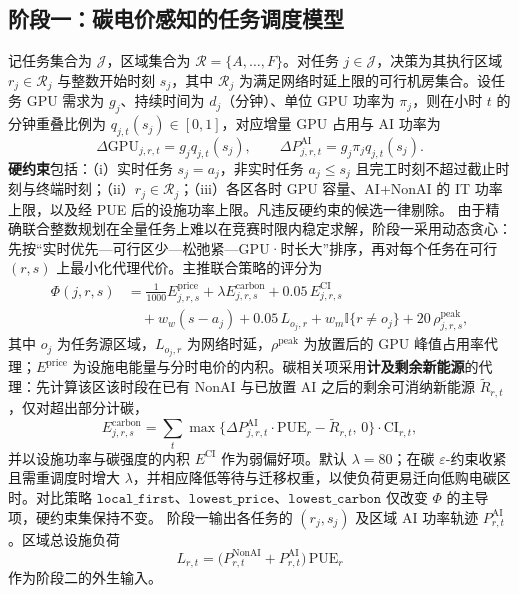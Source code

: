 \documentclass[UTF8,a4paper,zihao=-4]{ctexart}
\begin{document}
\subsection{阶段一：碳电价感知的任务调度模型}
记任务集合为 $\mathcal{J}$，区域集合为 $\mathcal{R}=\{A,\ldots,F\}$。对任务 $j\in\mathcal{J}$，决策为其执行区域 $r_j\in\mathcal{R}_j$ 与整数开始时刻 $s_j$，其中 $\mathcal{R}_j$ 为满足网络时延上限的可行机房集合。设任务 GPU 需求为 $g_j$、持续时间为 $d_j$（分钟）、单位 GPU 功率为 $\pi_j$，则在小时 $t$ 的分钟重叠比例为 $q_{j,t}(s_j)\in[0,1]$，对应增量 GPU 占用与 AI 功率为
\begin{equation}
\Delta\mathrm{GPU}_{j,r,t}
=
g_j q_{j,t}(s_j),\qquad
\Delta P^{\mathrm{AI}}_{j,r,t}
=
g_j\pi_j q_{j,t}(s_j).
\end{equation}
\textbf{硬约束}包括：（i）实时任务 $s_j=a_j$，非实时任务 $a_j\le s_j$ 且完工时刻不超过截止时刻与终端时刻；（ii）$r_j\in\mathcal{R}_j$；（iii）各区各时 GPU 容量、AI+NonAI 的 IT 功率上限，以及经 PUE 后的设施功率上限。凡违反硬约束的候选一律剔除。
由于精确联合整数规划在全量任务上难以在竞赛时限内稳定求解，阶段一采用动态贪心：先按“实时优先—可行区少—松弛紧—GPU·时长大”排序，再对每个任务在可行 $(r,s)$ 上最小化代理代价。主推联合策略的评分为
\begin{equation}
\begin{aligned}
\Phi(j,r,s)
&=
\frac{1}{1000}E^{\mathrm{price}}_{j,r,s}
+
\lambda E^{\mathrm{carbon}}_{j,r,s}
+
0.05\,E^{\mathrm{CI}}_{j,r,s}
\\
&\quad
+
w_w(s-a_j)
+
0.05\,L_{o_j,r}
+
w_m\mathbb{I}\{r\neq o_j\}
+
20\,\rho^{\mathrm{peak}}_{j,r,s},
\end{aligned}
\end{equation}
其中 $o_j$ 为任务源区域，$L_{o_j,r}$ 为网络时延，$\rho^{\mathrm{peak}}$ 为放置后的 GPU 峰值占用率代理；$E^{\mathrm{price}}$ 为设施电能量与分时电价的内积。碳相关项采用\textbf{计及剩余新能源}的代理：先计算该区该时段在已有 NonAI 与已放置 AI 之后的剩余可消纳新能源 $\widetilde{R}_{r,t}$，仅对超出部分计碳，
\begin{equation}
E^{\mathrm{carbon}}_{j,r,s}
=
\sum_{t}
\max\bigl\{
\Delta P^{\mathrm{AI}}_{j,r,t}\cdot\mathrm{PUE}_r-\widetilde{R}_{r,t},\,0
\bigr\}
\cdot
\mathrm{CI}_{r,t},
\end{equation}
并以设施功率与碳强度的内积 $E^{\mathrm{CI}}$ 作为弱偏好项。默认 $\lambda=80$；在碳 $\varepsilon$-约束收紧且需重调度时增大 $\lambda$，并相应降低等待与迁移权重，以使负荷更易迁向低购电碳区时。对比策略 $\texttt{local\_first}$、$\texttt{lowest\_price}$、$\texttt{lowest\_carbon}$ 仅改变 $\Phi$ 的主导项，硬约束集保持不变。
阶段一输出各任务的 $(r_j,s_j)$ 及区域 AI 功率轨迹 $P^{\mathrm{AI}}_{r,t}$。区域总设施负荷
\begin{equation}
L_{r,t}
=
\bigl(P^{\mathrm{NonAI}}_{r,t}+P^{\mathrm{AI}}_{r,t}\bigr)\,\mathrm{PUE}_r
\end{equation}
作为阶段二的外生输入。
\end{document}
